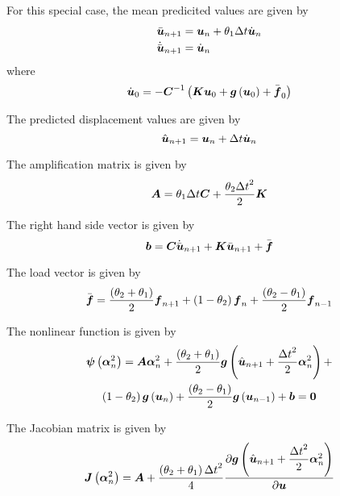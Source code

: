 For this special case, the mean predicited values are given by
\begin{equation}
  \begin{split}
    \bar{ \boldsymbol{u} }_{n+1} &=  \boldsymbol{u} _{n}+\theta_{1}\Delta t\dot{ \boldsymbol{u} }_{n}\\
    \dot{\bar{ \boldsymbol{u} }}_{n+1} &= \dot{ \boldsymbol{u} }_{n}
  \end{split}
\end{equation}
where
\begin{equation}
  \dot{\vectr{u}}_{0}=-\inverse{\matr{C}}\pbrac{\matr{K}\vectr{u}_{0}+\fnof{\vectr{g}}{\vectr{u}_{0}}+\bar{\vectr{f}}_{0}}
\end{equation}

The predicted displacement values are given by
\begin{equation}
   \hat{ \boldsymbol{u} }_{n+1} =  \boldsymbol{u} _{n}+\Delta t\dot{ \boldsymbol{u} }_{n}
\end{equation}

The amplification matrix is given by
\begin{equation}
  \matr{A}=\theta_{1}\Delta t\matr{C}+\dfrac{\theta_{2}{\Delta t}^{2}}{2}\matr{K}
\end{equation}

The right hand side vector is given by
\begin{equation}
  \vectr{b}=\matr{C}\dot{\bar{\vectr{u}}}_{n+1}+\matr{K}\bar{\vectr{u}}_{n+1}+\bar{\vectr{f}}
\end{equation}

The load vector is given by
\begin{equation}
  \bar{ \boldsymbol{f} }=\dfrac{\left( \theta_{2}+\theta_{1} \right)}{2} \boldsymbol{f} _{n+1}+\left( 1-\theta_{2} \right) \boldsymbol{f} _{n}
  +\dfrac{\left( \theta_{2}-\theta_{1} \right)}{2} \boldsymbol{f} _{n-1}
\end{equation}

The nonlinear function is given by
\begin{multline}
  \fnof{\vectr{\psi}}{\vectr{\alpha}^{2}_{n}}=\matr{A}\vectr{\alpha}^{2}_{n}+\dfrac{\pbrac{\theta_{2}+\theta_{1}}}{2}\fnof{\vectr{g}}{\hat{\vectr{u}}_{n+1}+
    \dfrac{{\Delta t}^{2}}{2}\vectr{\alpha}^{2}_{n}}+\\
  \pbrac{1-\theta_{2}}\fnof{\vectr{g}}{\vectr{u}_{n}}+\dfrac{\pbrac{\theta_{2}-\theta_{1}}}{2}\fnof{\vectr{g}}{\vectr{u}_{n-1}}+\vectr{b}=\vectr{0}
\end{multline}

The Jacobian matrix is given by
\begin{equation}
  \fnof{\matr{J}}{\vectr{\alpha}^{2}_{n}}=\matr{A}+\dfrac{\pbrac{\theta_{2}+\theta_{1}}{\Delta t}^{2}}{4}
  \delby{\fnof{\vectr{g}}{\hat{\vectr{u}}_{n+1}+\dfrac{{\Delta t}^{2}}{2}\vectr{\alpha}^{2}_{n}}}{\vectr{u}}
\end{equation}

